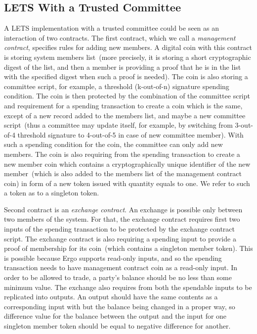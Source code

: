 \documentclass[]{llncs}   %
\begin{document}
\subsection{LETS With a Trusted Committee}
\label{sec-trusted}

A LETS implementation with a trusted committee could be seen as an interaction of two contracts. The first contract, which we
call a {\em management contract}, specifies rules for adding new members. A digital coin with this contract is storing system members list~(more precisely, it is storing a short cryptographic digest of the list, and then a member is providing a proof that he is in the list with the specified digest when such a proof is needed). The coin is also storing a committee script, for example, a threshold (k-out-of-n) signature spending condition. The coin is then protected by the combination of the committee script and requirement for a 
spending transaction to create a coin which is the same, except of a new record added to the members list, and maybe a new committee script~(thus a committee may update itself, for example, by switching from 3-out-of-4 threshold signature to 4-out-of-5 in case of new committee member). With such a spending condition for the coin, the committee can only add new members. The coin is also requiring from the spending transaction to create a new member coin which contains a cryptographically unique identifier of the new member~(which is also added to the members list of the management contract coin) in form of a new token issued with quantity equals to one. We 
refer to such a token as to a singleton token.

Second contract is an {\em exchange contract}. An exchange is possible only between two members of the system. For that, the exchange 
contract requires first two inputs of the spending transaction to be protected by the exchange contract script. The exchange contract is also 
requiring a spending input to provide a proof of membership for its coin~(which contains a singleton member token). This is possible because Ergo supports read-only inputs, and so the spending transaction needs to have management contract coin as a read-only input. In order to be allowed to trade, a party's balance should be no less than some minimum value. The exchange also requires from both the spendable inputs to be replicated into outputs. An output should have the same contents as a corresponding input with but the balance being changed in a proper way, so difference value for the balance between the output and the input for one singleton member token should be equal to negative difference for another.
\end{document}
